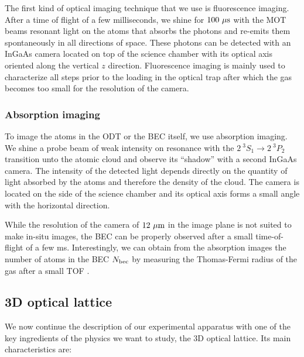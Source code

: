 The first kind of optical imaging technique that we use is fluorescence imaging. After a time of flight of a few milliseconds, we shine for $100 \ \mu \rm{s}$ with the MOT beams resonant light on the atoms that absorbs the photons and re-emits them spontaneously in all directions of space. These photons can be detected with an InGaAs camera located on top of the science chamber with its optical axis oriented along the vertical $z$ direction. Fluorescence imaging is mainly used to characterize all steps prior to the loading in the optical trap after which the gas becomes too small for the resolution of the camera.
 
\subsubsection{Absorption imaging}

To image the atoms in the ODT or the BEC itself, we use absorption imaging. We shine a probe beam of weak intensity on resonance with the $2 \ ^3 S_1 \rightarrow 2 \ ^3 P_2$ transition unto the atomic cloud and observe its ``shadow'' with a second InGaAs camera. The intensity of the detected light depends directly on the quantity of light absorbed by the atoms and therefore the density of the cloud. The camera is located on the side of the science chamber and its optical axis forms a small angle with the horizontal direction.

While the resolution of the camera of $12 \ \mu \rm{m}$ in the image plane is not suited to make in-situ images, the BEC can be properly observed after a small time-of-flight of a few ms. Interestingly, we can obtain from the absorption images the number of atoms in the BEC $N_{\rm{bec}}$ by measuring the Thomas-Fermi radius of the gas after a small TOF \cite{bouton_these}.



\subsection{3D optical lattice}

We now continue the description of our experimental apparatus with one of the key ingredients of the physics we want to study, the 3D optical lattice. Its main characteristics are: 

